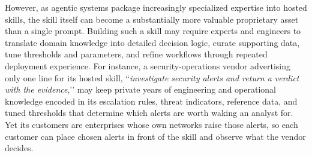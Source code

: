 \documentclass[letterpaper,twocolumn,10pt]{article}
\newcommand{\muxi}[1]{\textcolor{olive}{Muxi: #1}}
\begin{document}
However, as agentic systems package increasingly specialized expertise into hosted skills, the skill itself can become a substantially more valuable proprietary asset than a single prompt.
Building such a skill may require experts and engineers to translate domain knowledge into detailed decision logic, curate supporting data, tune thresholds and parameters, and refine workflows through repeated deployment experience. 
For instance, a security-operations vendor advertising only one line for its hosted skill, ``\textit{investigate security alerts and return a verdict with the evidence},’’ may keep private years of engineering and operational knowledge encoded in its escalation rules, threat indicators, reference data, and tuned thresholds that determine which alerts are worth waking an analyst for. 
Yet its customers are enterprises whose own networks raise those alerts, so each customer can place chosen alerts in front of the skill and observe what the vendor decides.

\end{document}
